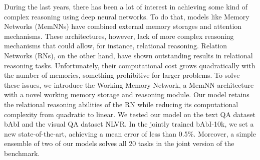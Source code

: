 During the last years, there has been a lot of interest in achieving some kind of complex reasoning using deep neural networks. To do that, models like Memory Networks (MemNNs) have combined external memory storages and attention mechanisms. These architectures, however, lack of more complex reasoning mechanisms that could allow, for instance, relational reasoning. Relation Networks (RNs), on the other hand, have shown outstanding results in relational reasoning tasks. Unfortunately, their computational cost grows quadratically with the number of memories, something prohibitive for larger problems. To solve these issues, we introduce the Working Memory Network, a MemNN architecture with a novel working memory storage and reasoning module. Our model retains the relational reasoning abilities of the RN while reducing its computational complexity from quadratic to linear. We tested our model on the text QA dataset bAbI and the visual QA dataset NLVR. In the jointly trained bAbI-10k, we set a new state-of-the-art, achieving a mean error of less than 0.5\%. Moreover, a simple ensemble of two of our models solves all 20 tasks in the joint version of the benchmark.
